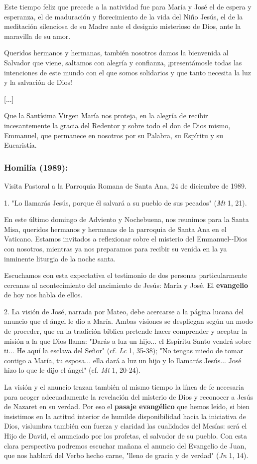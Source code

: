 Este tiempo feliz que precede a la natividad fue para María y José el de
espera y esperanza, el de maduración y florecimiento de la vida del Niño
Jesús, el de la meditación silenciosa de su Madre ante el designio
misterioso de Dios, ante la maravilla de su amor.

Queridos hermanos y hermanas, también nosotros damos la bienvenida al
Salvador que viene, saltamos con alegría y confianza, ¡presentámosle
todas las intenciones de este mundo con el que somos solidarios y que
tanto necesita la luz y la salvación de Dios!

{[}...{]}

Que la Santísima Virgen María nos proteja, en la alegría de recibir
incesantemente la gracia del Redentor y sobre todo el don de Dios mismo,
Emmanuel, que permanece en nosotros por su Palabra, su Espíritu y su
Eucaristía.

\subsubsection{Homilía (1989): }

Visita Pastoral a la Parroquia Romana de Santa Ana, 24 de diciembre de
1989.

1. "Lo llamarás Jesús, porque él salvará a su pueblo de sus pecados"
(\emph{Mt} 1, 21).

En este último domingo de Adviento y Nochebuena, nos reunimos para la
Santa Misa, queridos hermanos y hermanas de la parroquia de Santa Ana en
el Vaticano. Estamos invitados a reflexionar sobre el misterio del
Emmanuel-\/-Dios con nosotros, mientras ya nos preparamos para recibir
su venida en la ya inminente liturgia de la noche santa.

Escuchamos con esta expectativa el testimonio de dos personas
particularmente cercanas al acontecimiento del nacimiento de Jesús:
María y José. El \textbf{evangelio} de hoy nos habla de ellos.

2. La visión de José, narrada por Mateo, debe acercarse a la página
lucana del anuncio que el ángel le dio a María. Ambas visiones se
despliegan según un modo de proceder, que en la tradición bíblica
pretende hacer comprender y aceptar la misión a la que Dios llama:
"Darás a luz un hijo... el Espíritu Santo vendrá sobre ti... He aquí la
esclava del Señor" (cf. \emph{Lc} 1, 35-38); "No tengas miedo de tomar
contigo a María, tu esposa... ella dará a luz un hijo y lo llamarás
Jesús... José hizo lo que le dijo el ángel" (cf. \emph{Mt} 1, 20-24).

La visión y el anuncio trazan también al mismo tiempo la línea de fe
necesaria para acoger adecuadamente la revelación del misterio de Dios y
reconocer a Jesús de Nazaret en su verdad. Por eso el \textbf{pasaje
	evangélico} que hemos leído, si bien insistimos en la actitud interior
de humilde disponibilidad hacia la iniciativa de Dios, vislumbra también
con fuerza y ​​claridad las cualidades del Mesías: será el Hijo de
David, el anunciado por los profetas, el salvador de su pueblo. Con esta
clara perspectiva podremos escuchar mañana el anuncio del Evangelio de
Juan, que nos hablará del Verbo hecho carne, "lleno de gracia y de
verdad" (\emph{Jn} 1, 14).

